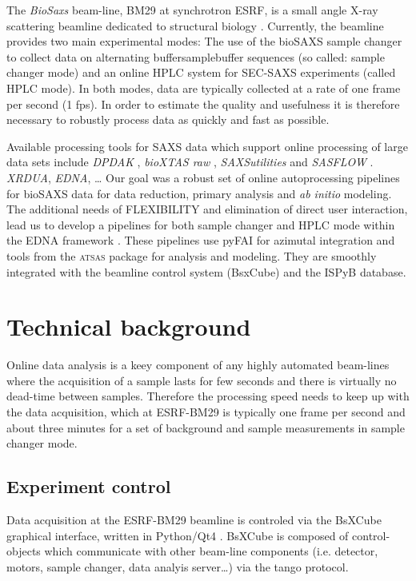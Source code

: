 \documentclass[preprint,pdf]{iucr}              %
\begin{document}
The \textit{BioSaxs} beam-line, BM29 at synchrotron ESRF, is a small angle X-ray
scattering beamline dedicated to structural biology \cite{BM29paper}.
Currently, the beamline provides two main experimental modes: The use of the
bioSAXS sample changer to collect data on alternating buffer\/sample\/buffer
sequences (so called: sample changer mode) and an online HPLC system for
SEC-SAXS experiments (called HPLC mode).
In both modes, data are typically collected at a rate of one frame per second
(1 fps).
In order to estimate the quality and usefulness it is therefore necessary to
robustly process data as quickly and fast as possible.

Available processing tools for SAXS data which support online processing of
large data sets include \textit{DPDAK} \cite{DPDAK}, \textit{bioXTAS raw}
\cite{BioXTASraw}, \textit{SAXSutilities} \cite{SAXSUtilities} and
\textit{SASFLOW} \cite{X33P,P12}.  \textit{XRDUA}, \textit{EDNA}, \ldots
Our goal was a robust set of online autoprocessing pipelines for bioSAXS data
for data reduction, primary analysis and \textit{ab initio} modeling.
The additional needs of FLEXIBILITY and elimination of direct user interaction,
lead us to develop a pipelines for both sample changer and HPLC mode within the
EDNA framework \cite{edna}.
These pipelines use pyFAI for azimutal integration \cite{pyFAI} and tools from
the \textsc{atsas} package \cite{ATSAS1, ATSAS2} for analysis and modeling. They are
smoothly integrated with the beamline control system (BsxCube) and the ISPyB
database.

\section{Technical background}

Online data analysis is a keey component of any highly automated beam-lines
where the acquisition of a sample lasts for few seconds and there is
virtually no dead-time between samples.
Therefore the processing speed needs to keep up with the data acquisition, which
at ESRF-BM29 is typically one frame per second and about three minutes for a set
of background and sample measurements in sample changer mode.


\subsection{Experiment control}
Data acquisition at the ESRF-BM29 beamline is controled via the BsXCube
graphical interface, written in Python/Qt4 \cite{pyqt}.
BsXCube is composed of control-objects which communicate with other beam-line
components (i.e. detector, motors, sample changer, data analyis server\ldots)
via the tango protocol\cite{tango}.
\end{document}

